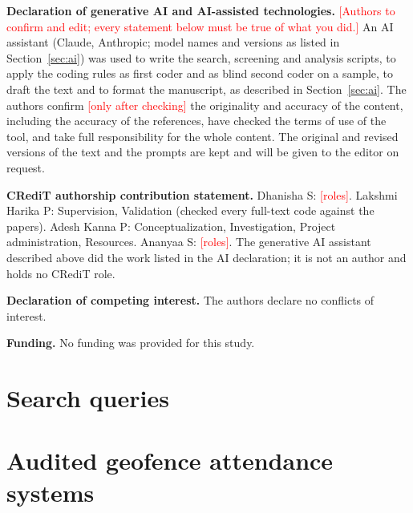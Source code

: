 \documentclass[12pt]{article}
\newcommand{\todo}[1]{\textcolor{red}{[#1]}}
\begin{document}
\noindent\textbf{Declaration of generative AI and AI-assisted technologies.} \todo{Authors to confirm and edit; every statement below must be true of what you did.} An AI assistant (Claude, Anthropic; model names and versions as listed in Section~\ref{sec:ai}) was used to write the search, screening and analysis scripts, to apply the coding rules as first coder and as blind second coder on a sample, to draft the text and to format the manuscript, as described in Section~\ref{sec:ai}. The authors confirm \todo{only after checking} the originality and accuracy of the content, including the accuracy of the references, have checked the terms of use of the tool, and take full responsibility for the whole content. The original and revised versions of the text and the prompts are kept and will be given to the editor on request.

\noindent\textbf{CRediT authorship contribution statement.} Dhanisha S: \todo{roles}. Lakshmi Harika P: Supervision, Validation (checked every full-text code against the papers). Adesh Kanna P: Conceptualization, Investigation, Project administration, Resources. Ananyaa S: \todo{roles}. The generative AI assistant described above did the work listed in the AI declaration; it is not an author and holds no CRediT role.

\noindent\textbf{Declaration of competing interest.} The authors declare no conflicts of interest.

\noindent\textbf{Funding.} No funding was provided for this study.

\appendix
\section{Search queries}\label{app:queries}


\section{Audited geofence attendance systems}\label{app:audit}




\end{document}
